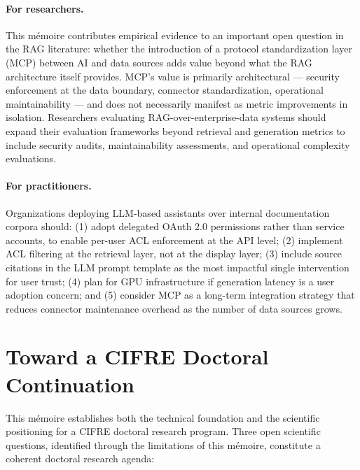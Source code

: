 \paragraph{For researchers.} This mémoire contributes empirical evidence to an important open question in the RAG literature: whether the introduction of a protocol standardization layer (MCP) between AI and data sources adds value beyond what the RAG architecture itself provides. MCP's value is primarily architectural --- security enforcement at the data boundary, connector standardization, operational maintainability --- and does not necessarily manifest as metric improvements in isolation. Researchers evaluating RAG-over-enterprise-data systems should expand their evaluation frameworks beyond retrieval and generation metrics to include security audits, maintainability assessments, and operational complexity evaluations.

\paragraph{For practitioners.} Organizations deploying LLM-based assistants over internal documentation corpora should: (1) adopt delegated OAuth 2.0 permissions rather than service accounts, to enable per-user ACL enforcement at the API level; (2) implement ACL filtering at the retrieval layer, not at the display layer; (3) include source citations in the LLM prompt template as the most impactful single intervention for user trust; (4) plan for GPU infrastructure if generation latency is a user adoption concern; and (5) consider MCP as a long-term integration strategy that reduces connector maintenance overhead as the number of data sources grows.

\section{Toward a CIFRE Doctoral Continuation}
\label{sec:conc-phd}

This mémoire establishes both the technical foundation and the scientific positioning for a CIFRE doctoral research program. Three open scientific questions, identified through the limitations of this mémoire, constitute a coherent doctoral research agenda:


